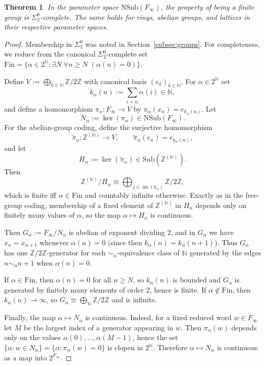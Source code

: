 \documentclass[12pt,fleqn,a4paper]{amsart}
\renewcommand{\ge}{\geqslant}
\numberwithin{equation}{section}
\newtheorem{theorem}{Theorem}[section]
\theoremstyle{definition}
\newcommand{\N}{\mathbb{N}}
\newcommand{\Z}{\mathbb{Z}}
\newcommand{\NSub}{\mathrm{NSub}}
\newcommand{\Sub}{\mathrm{Sub}}
\begin{document}
\begin{theorem}\label{thm:finite-sigma2-complete}
In the parameter space $\NSub(F_\infty)$, the property of being
a finite group is $\Sigma^0_2$-complete.  The same holds for rings, abelian groups,
and lattices in their respective parameter spaces.
\end{theorem}

\begin{proof}
Membership in $\Sigma^0_2$ was noted in Section~\ref{subsec:groups}.  For completeness,
we reduce from the canonical $\Sigma^0_2$-complete set
$\mathrm{Fin} = \{ \alpha \in 2^\N : \exists N\; \forall n \ge N\; (\alpha(n) = 0) \}$.

Define $V:=\bigoplus_{k\in\N}\Z/2\Z$ with canonical basis $(e_k)_{k\in\N}$.
For $\alpha\in 2^\N$ set
\[
k_\alpha(n):=\sum_{i<n}\alpha(i)\in\N,
\]
and define a homomorphism $\pi_\alpha:F_\infty\to V$ by $\pi_\alpha(x_n)=e_{k_\alpha(n)}$.
Let 
\[
    N_\alpha:=\ker(\pi_\alpha)\in\NSub(F_\infty).
\]
For the abelian-group coding, define the surjective homomorphism
\[
\widetilde\pi_\alpha:\Z^{(\N)}\to V,
\qquad
\widetilde\pi_\alpha(e_n)=e_{k_\alpha(n)},
\]
and let
\[
H_\alpha:=\ker(\widetilde\pi_\alpha)\in \Sub(\Z^{(\N)}).
\]
Then
\[
\Z^{(\N)}/H_\alpha\cong \bigoplus_{j\in\operatorname{im}(k_\alpha)} \Z/2\Z,
\]
which is finite iff $\alpha\in\mathrm{Fin}$ and countably infinite otherwise.
Exactly as in the free-group coding, membership of a fixed element of $\Z^{(\N)}$ in
$H_\alpha$ depends only on finitely many values of $\alpha$, so the map
$\alpha\mapsto H_\alpha$ is continuous.

Then $G_\alpha:=F_\infty/N_\alpha$ is abelian of exponent dividing $2$, and in $G_\alpha$
we have $x_n=x_{n+1}$ whenever $\alpha(n)=0$ (since then $k_\alpha(n)=k_\alpha(n+1)$).
Thus $G_\alpha$ has one $\Z/2\Z$-generator for each $\sim_\alpha$-equivalence class
of $\N$ generated by the edges $n\sim_\alpha n{+}1$ when $\alpha(n)=0$.

If $\alpha\in\mathrm{Fin}$, then $\alpha(n)=0$ for all $n\ge N$, so $k_\alpha(n)$ is bounded
and $G_\alpha$ is generated by finitely many elements of order $2$, hence is finite.
If $\alpha\notin\mathrm{Fin}$, then $k_\alpha(n)\to\infty$, so $G_\alpha\cong\bigoplus_\N\Z/2\Z$
and is infinite.

Finally, the map $\alpha\mapsto N_\alpha$ is continuous.
Indeed, for a fixed reduced word $w\in F_\infty$ let $M$ be the largest index of a generator
appearing in $w$.  Then $\pi_\alpha(w)$ depends only on the values $\alpha(0),\dots,\alpha(M{-}1)$,
hence the set $\{\alpha: w\in N_\alpha\}=\{\alpha:\pi_\alpha(w)=0\}$ is clopen in $2^\N$.
Therefore $\alpha\mapsto N_\alpha$ is continuous as a map into $2^{F_\infty}$.


\end{proof}
\end{document}
